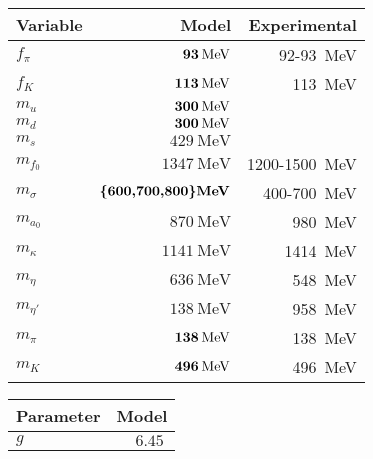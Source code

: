 \begin{table}
\centering
\begin{tabular}{ l r r }
	\toprule
	Variable          & Model                                   & Experimental                            \\
	\midrule
	$f_\pi$           & $\textbf{\SI{93}{\mega\electronvolt}}$  & \SI{92}{}-\SI{93}{\mega\electronvolt}            \\
	$f_K$             & $\textbf{\SI{113}{\mega\electronvolt}}$ & \SI{113}{\mega\electronvolt}                     \\
	\midrule
	$m_u$             & $\textbf{\SI{300}{\mega\electronvolt}}$ & \TODO{?}                                         \\
	$m_d$             & $\textbf{\SI{300}{\mega\electronvolt}}$ & \TODO{?}                                         \\
	$m_s$             & $\SI{429}{\mega\electronvolt}$          & \TODO{?}                                         \\
	\midrule
	$m_{f_0}$         & $\SI{1347}{\mega\electronvolt}$         & \SI{1200}{}-\SI{1500}{\mega\electronvolt}        \\
	$m_\sigma$        & $\textbf{\{600,700,800\}\si{\mega\electronvolt}}$ & \SI{400}{}-\SI{700}{\mega\electronvolt}          \\
	$m_{a_0}$         & $\SI{870}{\mega\electronvolt}$          & \SI{980}{\mega\electronvolt}                     \\
	$m_\kappa$        & $\SI{1141}{\mega\electronvolt}$         & \SI{1414}{\mega\electronvolt}                    \\
	$m_\eta$          & $\SI{636}{\mega\electronvolt}$          & \SI{548}{\mega\electronvolt}                     \\
	$m_{\eta'}$       & $\SI{138}{\mega\electronvolt}$          & \SI{958}{\mega\electronvolt}                     \\
	$m_\pi$           & $\textbf{\SI{138}{\mega\electronvolt}}$ & \SI{138}{\mega\electronvolt}                     \\
	$m_K$             & $\textbf{\SI{496}{\mega\electronvolt}}$ & \SI{496}{\mega\electronvolt}                     \\
	\bottomrule
\end{tabular}
\hfill
\begin{tabular}{ l r }
	\toprule
	Parameter   & Model                                 \\
	\midrule
	$g$         & $\SI{6.45}{}$                         \\

\end{tabular}
\end{table}
